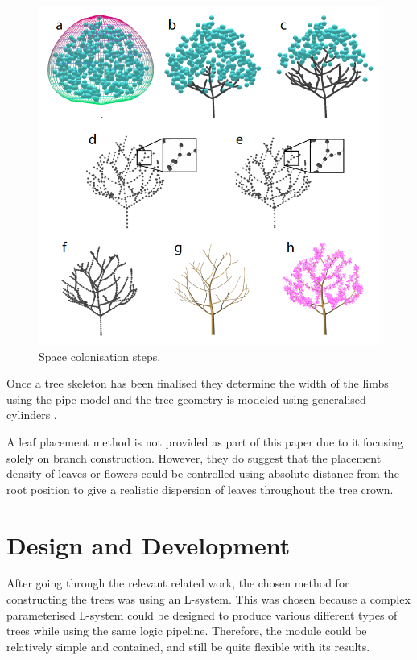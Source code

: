 \documentclass[final]{cmpreport}
\begin{document}
\begin{figure}[ht]
    \includegraphics[scale=0.5]{space-colonisation.PNG} 
    \centering
    \captionsetup{justification=centering}
    \caption{Space colonisation steps.}
    \label{fig:space-colonisation}
\end{figure}

Once a tree skeleton has been finalised they determine the width of the limbs using the pipe 
model \citep{shinozaki1964quantitative} and the tree geometry is modeled using generalised 
cylinders \citep{bloomenthal1985modeling}.

A leaf placement method is not provided as part of this paper due to it focusing solely on 
branch construction. However, they do suggest that the placement density of leaves or flowers 
could be controlled using absolute distance from the root position to give a realistic dispersion 
of leaves throughout the tree crown.

\section{Design and Development}
After going through the relevant related work, the chosen method for constructing the trees was 
using an L-system. This was chosen because a complex parameterised L-system could be designed to 
produce various different types of trees while using the same logic pipeline. Therefore, the 
module could be relatively simple and contained, and still be quite flexible with its results.
\end{document}
